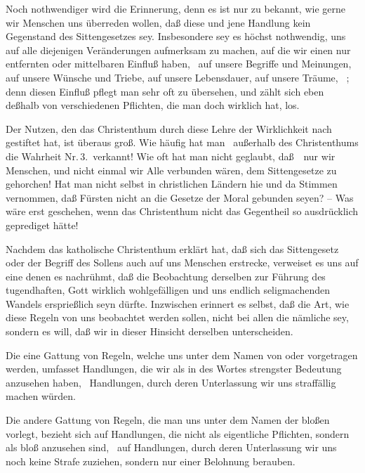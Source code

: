 \begin{aufza}
\item Noch nothwendiger wird die Erinnerung,  denn es ist nur zu bekannt, wie gerne wir Menschen uns überreden wollen, daß diese und jene Handlung kein Gegenstand des Sittengesetzes sey. Insbesondere sey es höchst nothwendig, uns auf alle diejenigen Veränderungen aufmerksam zu machen, auf die wir einen nur entfernten oder mittelbaren Einfluß haben, \zB\  auf unsere Begriffe und Meinungen, auf unsere Wünsche und Triebe, auf unsere Lebensdauer, auf unsere Träume, \udgl\ ; denn diesen Einfluß pflegt man sehr oft zu übersehen, und zählt sich eben deßhalb von verschiedenen Pflichten, die man doch wirklich hat, los.
\end{aufza}

Der Nutzen, den das Christenthum durch diese Lehre der Wirklichkeit nach gestiftet hat, ist überaus groß. Wie häufig hat man \zB\  außerhalb des Christenthums die Wahrheit Nr.\,3.\ verkannt! Wie oft hat man nicht geglaubt, daß~\ nur wir Menschen, und nicht einmal wir Alle verbunden wären, dem Sittengesetze zu gehorchen! Hat man nicht selbst in christlichen Ländern hie und da Stimmen vernommen, daß Fürsten nicht an die Gesetze der Moral gebunden seyen? -- Was wäre erst geschehen, wenn das Christenthum nicht das Gegentheil so ausdrücklich geprediget hätte!

Nachdem das katholische Christenthum erklärt hat, daß sich das Sittengesetz oder der Begriff des Sollens auch auf uns Menschen erstrecke, verweiset es uns auf eine  denen es nachrühmt, daß die Beobachtung derselben zur Führung des tugendhaften, Gott wirklich wohlgefälligen und uns endlich seligmachenden Wandels ersprießlich seyn dürfte. Inzwischen erinnert es selbst, daß die Art, wie diese Regeln von uns beobachtet werden sollen, nicht bei allen die nämliche sey, sondern es will, daß wir in dieser Hinsicht  derselben unterscheiden.
\begin{aufza}
\item Die eine Gattung von Regeln, welche uns unter dem Namen von  oder  vorgetragen werden, umfasset Handlungen, die wir als  in des Wortes strengster Bedeutung anzusehen haben, \dh\  Handlungen, durch deren Unterlassung wir uns straffällig machen würden.
\item Die andere Gattung von Regeln, die man uns unter dem Namen der bloßen  vorlegt, bezieht sich auf Handlungen, die nicht als eigentliche Pflichten, sondern als bloß  anzusehen sind, \dh\  auf Handlungen, durch deren Unterlassung wir uns noch keine Strafe zuziehen, sondern nur einer Belohnung berauben.
\end{aufza}

